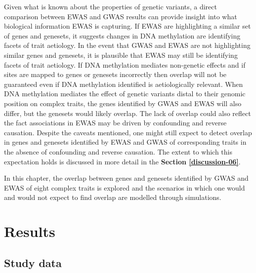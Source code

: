 \documentclass[11pt,twoside]{bristolthesis}
\begin{document}
Given what is known about the properties of genetic variants, a direct comparison between EWAS and GWAS results can provide insight into what biological information EWAS is capturing. If EWAS are highlighting a similar set of genes and genesets, it suggests changes in DNA methylation are identifying facets of trait aetiology. In the event that GWAS and EWAS are not highlighting similar genes and genesets, it is plausible that EWAS may still be identifying facets of trait aetiology. If DNA methylation mediates non-genetic effects and if sites are mapped to genes or genesets incorrectly then overlap will not be guaranteed even if DNA methylation identified is aetiologically relevant. When DNA methylation mediates the effect of genetic variants distal to their genomic position on complex traits, the genes identified by GWAS and EWAS will also differ, but the genesets would likely overlap. The lack of overlap could also reflect the fact associations in EWAS may be driven by confounding and reverse causation. Despite the caveats mentioned, one might still expect to detect overlap in genes and genesets identified by EWAS and GWAS of corresponding traits in the absence of confounding and reverse causation. The extent to which this expectation holds is discussed in more detail in the \textbf{Section \ref{discussion-06}}.

In this chapter, the overlap between genes and genesets identified by GWAS and EWAS of eight complex traits is explored and the scenarios in which one would and would not expect to find overlap are modelled through simulations.

\hypertarget{results-06}{%
\section{Results}\label{results-06}}

\hypertarget{study-data}{%
\subsection{Study data}\label{study-data}}
\end{document}
